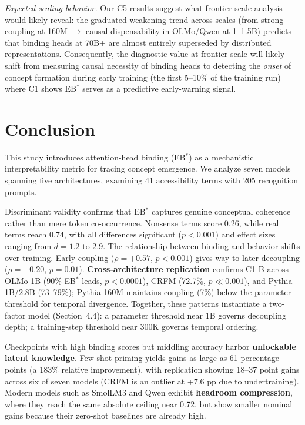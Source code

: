 \documentclass[10pt]{article} %
\begin{document}
\begin{enumerate}
  \emph{Expected scaling behavior.} Our C5 results suggest what frontier-scale analysis would likely reveal: the graduated weakening trend across scales (from strong coupling at 160M $\to$ causal dispensability in OLMo/Qwen at 1--1.5B) predicts that binding heads at 70B+ are almost entirely superseded by distributed representations. Consequently, the diagnostic value at frontier scale will likely shift from measuring causal necessity of binding heads to detecting the \emph{onset} of concept formation during early training (the first 5--10\% of the training run) where C1 shows EB$^*$ serves as a predictive early-warning signal.
\end{enumerate}

\section{Conclusion}

This study introduces attention-head binding (EB$^*$) as a mechanistic interpretability metric for tracing concept emergence. We analyze seven models spanning five architectures, examining 41 accessibility terms with 205 recognition prompts.

Discriminant validity confirms that EB$^*$ captures genuine conceptual coherence rather than mere token co-occurrence. Nonsense terms score 0.26, while real terms reach 0.74, with all differences significant ($p<0.001$) and effect sizes ranging from $d=1.2$ to $2.9$.
The relationship between binding and behavior shifts over training. Early coupling ($\rho=+0.57$, $p<0.001$) gives way to later decoupling ($\rho=-0.20$, $p=0.01$).
\textbf{Cross-architecture replication} confirms C1-B across OLMo-1B (90\% EB$^*$-leads, $p<0.0001$), CRFM (72.7\%, $p \ll 0.001$), and Pythia-1B/2.8B (73--79\%); Pythia-160M maintains coupling (7\%) below the parameter threshold for temporal divergence.
Together, these patterns instantiate a two-factor model (Section~4.4): a parameter threshold near 1B governs decoupling depth; a training-step threshold near 300K governs temporal ordering.

Checkpoints with high binding scores but middling accuracy harbor \textbf{unlockable latent knowledge}. Few-shot priming yields gains as large as 61 percentage points (a 183\% relative improvement), with replication showing 18--37 point gains across six of seven models (CRFM is an outlier at +7.6 pp due to undertraining). Modern models such as SmolLM3 and Qwen exhibit \textbf{headroom compression}, where they reach the same absolute ceiling near 0.72, but show smaller nominal gains because their zero-shot baselines are already high.
\end{document}
